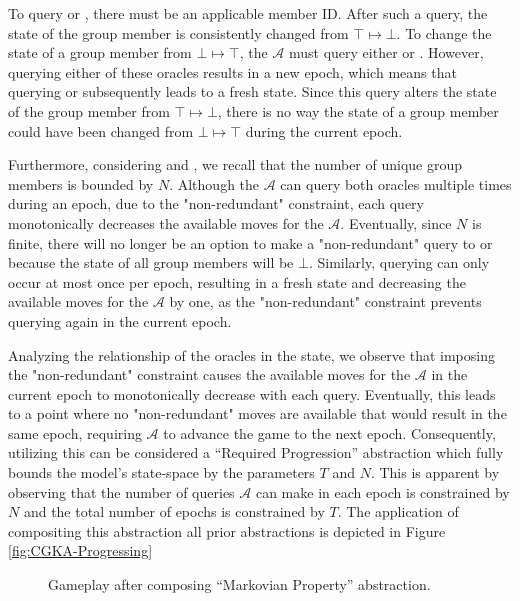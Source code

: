 \documentclass[runningheads]{llncs}
\newcommand{\Adversary}{\ensuremath{\mathcal{A}}\xspace}
\begin{document}
To query  or , there must be an applicable member ID.
After such a query, the state of the group member is consistently changed from $\top \mapsto \bot$.
To change the state of a group member from $\bot \mapsto \top$, the \Adversary must query either  or .
However, querying either of these oracles results in a new epoch, which means that querying  or  subsequently leads to a fresh state.
Since this query alters the state of the group member from $\top \mapsto \bot$, there is no way the state of a group member could have been changed from $\bot \mapsto \top$ during the current epoch.

Furthermore, considering  and , we recall that the number of unique group members is bounded by $N$.
Although the \Adversary can query both oracles multiple times during an epoch, due to the "non-redundant" constraint, each query monotonically decreases the available moves for the \Adversary.
Eventually, since $N$ is finite, there will no longer be an option to make a "non-redundant" query to  or  because the state of all group members will be $\bot$. Similarly, querying  can only occur at most once per epoch, resulting in a fresh state and decreasing the available moves for the \Adversary by one, as the "non-redundant" constraint prevents querying  again in the current epoch.

Analyzing the relationship of the oracles in the \CGKAsec state, we observe that imposing the "non-redundant" constraint causes the available moves for the \Adversary in the current epoch to monotonically decrease with each query. Eventually, this leads to a point where no "non-redundant" moves are available that would result in the same epoch, requiring \Adversary to advance the game to the next epoch.
Consequently, utilizing this can be considered a ``Required Progression''  abstraction which fully bounds the model's state-space by the parameters $T$ and $N$.
This is apparent by observing that the number of queries \Adversary can make in each epoch is constrained by $N$ and the total number of epochs is constrained by $T$.
The application of compositing this abstraction all prior abstractions is depicted in Figure \ref{fig:CGKA-Progressing}

\begin{figure}
\centering
{}
\caption[Transition graph of informal CGKA definition]{%
\label{fig:CGKA-Progressing}%
Gameplay after composing ``Required Progression'' abstraction.%
}%
\vfill
{}
\caption[Transition graph of informal CGKA definition]{%
\label{fig:CGKA-Markovian}%
Gameplay after composing ``Markovian Property'' abstraction.%
}%
\end{figure}
\end{document}
